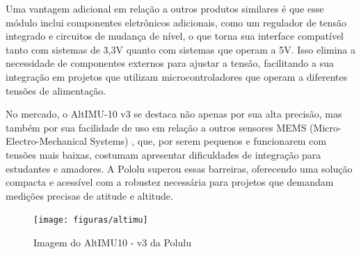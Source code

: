\documentclass[
	12pt,				%
	openright,			%
	oneside,			%
	a4paper,			%
	english,			%
	brazil				%
	]{abntex2}
\begin{document}
\begin{table}[]
	\caption{Tabela de endereçamento de cada Barramento I²C}
	\label{tab:endereco}
\end{table}


Uma vantagem adicional em relação a outros produtos similares é que esse módulo inclui componentes eletrônicos adicionais, como um regulador de tensão integrado e circuitos de mudança de nível, o que torna sua interface compatível tanto com sistemas de 3,3V quanto com sistemas que operam a 5V. Isso elimina a necessidade de componentes externos para ajustar a tensão, facilitando a sua integração em projetos que utilizam microcontroladores que operam a diferentes tensões de alimentação.

No mercado, o AltIMU-10 v3 se destaca não apenas por sua alta precisão, mas também por sua facilidade de uso em relação a outros sensores MEMS (Micro-Electro-Mechanical Systems) , que, por serem pequenos e funcionarem com tensões mais baixas, costumam apresentar dificuldades de integração para estudantes e amadores. A Pololu superou essas barreiras, oferecendo uma solução compacta e acessível com a robustez necessária para projetos que demandam medições precisas de atitude e altitude. \cite{Polulu2024}

\begin{figure}[h]
	\centering
	\texttt{[image: figuras/altimu]}
	\caption[AltIMU10 - v3]{Imagem do AltIMU10 - v3 da Polulu}
	\label{fig:altimu}
\end{figure}
\end{document}
